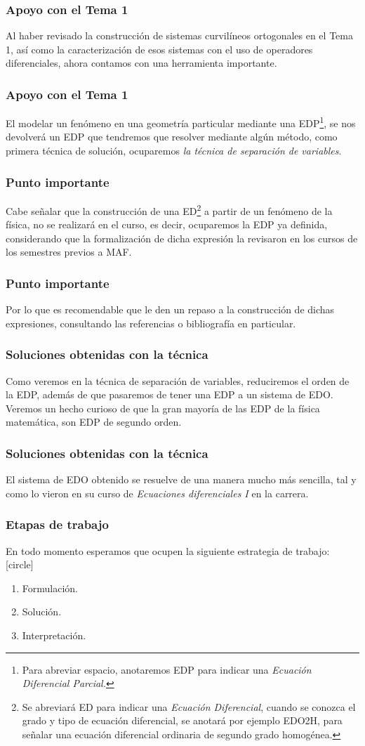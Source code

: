 \documentclass[12pt]{beamer}
\begin{document}
\begin{frame}
\frametitle{Apoyo con el Tema 1}
Al haber revisado la construcción de sistemas curvilíneos ortogonales en el Tema 1, así como la caracterización de esos sistemas con el uso de operadores diferenciales, ahora contamos con una herramienta importante.
\end{frame}
\begin{frame}
\frametitle{Apoyo con el Tema 1}
El modelar un fenómeno en una geometría particular mediante una EDP\footnote{Para abreviar espacio, anotaremos EDP para indicar una \emph{Ecuación Diferencial Parcial.}}, se nos devolverá un EDP que tendremos que resolver mediante algún método, como primera técnica de solución, ocuparemos \emph{la técnica de separación de variables}.
\end{frame}
\begin{frame}
\frametitle{Punto importante}
Cabe señalar que la construcción de una ED\footnote{Se abreviará ED para indicar una \emph{Ecuación Diferencial}, cuando se conozca el grado y tipo de ecuación diferencial, se anotará por ejemplo EDO2H, para señalar una ecuación diferencial ordinaria de segundo grado homogénea.} a partir de un fenómeno de la física, no se realizará en el curso, es decir, ocuparemos la EDP ya definida, considerando que la formalización de dicha expresión la revisaron en los cursos de los semestres previos a MAF.
\end{frame}
\begin{frame}
\frametitle{Punto importante}
Por lo que es recomendable que le den un repaso a la construcción de dichas expresiones, consultando las referencias o bibliografía en particular.
\end{frame}
\begin{frame}
\frametitle{Soluciones obtenidas con la técnica}
Como veremos en la técnica de separación de variables, reduciremos el orden de la EDP, además de que pasaremos de tener una EDP a un sistema de EDO.
\\
\bigskip
Veremos un hecho curioso de que la gran mayoría de las EDP de la física matemática, son EDP de segundo orden.
\end{frame}
\begin{frame}
\frametitle{Soluciones obtenidas con la técnica}
El sistema de EDO obtenido se resuelve de una manera mucho más sencilla, tal y como lo vieron en su curso de \emph{Ecuaciones diferenciales I} en la carrera.
\end{frame}
\begin{frame}
\frametitle{Etapas de trabajo}
En todo momento esperamos que ocupen la siguiente estrategia de trabajo:
[circle]
\begin{enumerate}[<+->]
\item Formulación.
\item Solución.
\item Interpretación.
\end{enumerate}
\end{frame}
\end{document}
